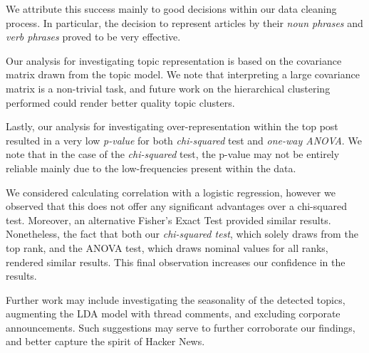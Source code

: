 \documentclass[11pt,journal,final,a4paper]{IEEEtran}
\begin{document}
We attribute this success mainly to good decisions within our data cleaning process. In particular, the decision to represent articles by their \textit{noun phrases} and \textit{verb phrases} proved to be very effective.

Our analysis for investigating topic representation is based on the covariance matrix drawn from the topic model. We note that interpreting a large covariance matrix is a non-trivial task, and future work on the hierarchical clustering performed could render better quality topic clusters.

Lastly, our analysis for investigating over-representation within the top post resulted in a very low \textit{p-value} for both \textit{chi-squared} test and \textit{one-way ANOVA}. We note that in the case of the \textit{chi-squared} test, the p-value may not be entirely reliable mainly due to the low-frequencies present within the data\cite{test:yates}. 

We considered calculating correlation with a logistic regression, however we observed that this does not offer any significant advantages over a chi-squared test. Moreover, an alternative Fisher's Exact Test\cite{test:fisher} \cite{test:comparison} provided similar results. Nonetheless, the fact that both our \textit{chi-squared test}, which solely draws from the top rank, and the ANOVA test, which draws nominal values for all ranks, rendered similar results. This final observation increases our confidence in the results.

Further work may include investigating the seasonality of the detected topics, augmenting the LDA model with thread comments, and excluding corporate announcements. Such suggestions may serve to further corroborate our findings, and better capture the spirit of Hacker News.


 


\newpage
%
\end{document}
